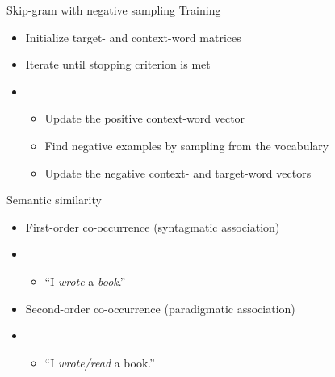 \documentclass[10pt]{beamer}
\begin{document}
\begin{frame}
  {Skip-gram with negative sampling}
  {Training}
  \begin{itemize}
    \item Initialize target- and context-word matrices
    \item Iterate until stopping criterion is met
    \item[]
          \begin{itemize}
            \item Update the positive context-word vector
            \item Find negative examples by sampling from the vocabulary
            \item Update the negative context- and target-word vectors
          \end{itemize}
  \end{itemize}
\end{frame}

\begin{frame}
  {Semantic similarity}
  \begin{itemize}
    \item First-order co-occurrence (syntagmatic association)
    \item[]
          \begin{itemize}
            \item ``I \textit{wrote} a \textit{book}.''
          \end{itemize}
    \item Second-order co-occurrence (paradigmatic association)
    \item[]
          \begin{itemize}
            \item ``I \textit{wrote/read} a book.''
          \end{itemize}
  \end{itemize}
\end{frame}
\end{document}

